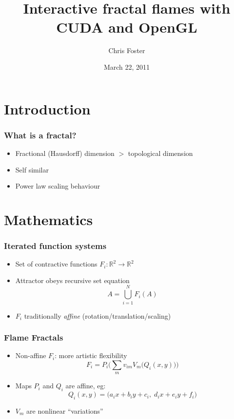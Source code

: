 \documentclass{beamer}
\title[Interactive fractal flames]{Interactive fractal flames with CUDA and OpenGL}
\author{Chris Foster}
\institute{ROAMES}
\date{March 22, 2011}
\begin{document}
\begin{frame}[plain]
  \titlepage
\end{frame}



\section{Introduction}

\begin{frame}
  \frametitle{What is a fractal?}
  \begin{itemize}
    \item<1>
      Fractional (Hausdorff) dimension $>$ topological dimension
    \item<2>
      Self similar
    \item<3>
      Power law scaling behaviour
  \end{itemize}
  \vspace{4cm}
\end{frame}



\section{Mathematics}

\begin{frame}
  \frametitle{Iterated function systems}
  \begin{itemize}
    \item
      Set of contractive functions $F_i \colon \mathbb{R}^2\to\mathbb{R}^2$
    \item
      Attractor obeys recursive set equation
      \[
      A = \bigcup_{i=1}^N F_i(A)
      \]
    \item
      $F_i$ traditionally \emph{affine} (rotation/translation/scaling)
  \end{itemize}
\end{frame}


\begin{frame}
  \frametitle{Flame Fractals}
  \begin{itemize}
    \item
      Non-affine $F_i$: more artistic flexibility
      \[
      F_i = P_i\bigg(\sum_m v_{im} V_m\big(Q_i(x,y)\big)\bigg)
      \]
    \item
      Maps $P_i$ and $Q_i$ are affine, eg:
      \[
        Q_i(x,y) = \big(a_i x + b_i y + c_i,\; d_i x + e_i y + f_i \big)
      \]
    \item
      $V_m$ are nonlinear ``variations''
  \end{itemize}
\end{frame}
\end{document}

